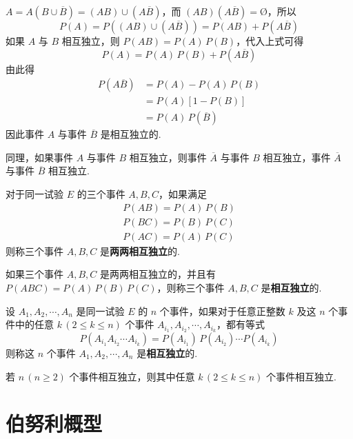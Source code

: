 \begin{myproof}
    $A = A (B \cup \overline{B}) = (AB) \cup (A \overline{B})$，而 $(AB)(A \overline{B})=\text{\O}$，所以
    $$
    P(A) = P((AB) \cup (A \overline{B})) = P(AB) + P(A \overline{B})
    $$
    如果 $A$ 与 $B$ 相互独立，则 $P(AB)=P(A)\,P(B)$，代入上式可得
    $$
    P(A) = P(A) \, P(B) + P(A \overline{B})
    $$
    由此得
    $$
    \begin{aligned}
        P(A \overline{B}) &= P(A) - P(A) \, P(B)\\
        &= P(A)[1-P(B)]\\
        &= P(A) \, P(\overline{B})
    \end{aligned}
    $$
    因此事件 $A$ 与事件 $\overline{B}$ 是相互独立的.
\end{myproof}

同理，如果事件 $A$ 与事件 $B$ 相互独立，则事件 $\overline{A}$ 与事件 $B$ 相互独立，事件 $\overline{A}$ 与事件 $\overline{B}$ 相互独立.

\begin{definition} \label{def:independent-of-each-other-3}
    对于同一试验 $E$ 的三个事件 $A,B,C$，如果满足
    \begin{gather*}
        P(AB)=P(A)\,P(B)\\
        P(BC)=P(B)\,P(C)\\
        P(AC)=P(A)\,P(C)
    \end{gather*}
    则称三个事件 $A,B,C$ 是\textbf{两两相互独立}的.
\end{definition}

\begin{definition} \label{def:independent-3}
    如果三个事件 $A,B,C$ 是两两相互独立的，并且有 $P(ABC)=P(A)\,P(B)\,P(C)$，则称三个事件 $A,B,C$ 是\textbf{相互独立}的.
\end{definition}

\begin{definition} \label{def:independent-more}
    设 $A_1,A_2,\cdots,A_n$ 是同一试验 $E$ 的 $n$ 个事件，如果对于任意正整数 $k$ 及这 $n$ 个事件中的任意 $k\,(2\leqslant k\leqslant n)$ 个事件 $A_{i_1},A_{i_2},\cdots,A_{i_k}$，都有等式
    $$
    P(A_{i_1} A_{i_2} \cdots A_{i_k}) = P(A_{i_1}) \, P(A_{i_2}) \cdots P(A_{i_k})
    $$
    则称这 $n$ 个事件 $A_1,A_2,\cdots,A_n$ 是\textbf{相互独立}的.
\end{definition}

若 $n\, (n \geqslant 2)$ 个事件相互独立，则其中任意 $k\, (2 \leqslant k \leqslant n)$ 个事件相互独立.

\section{伯努利概型}

